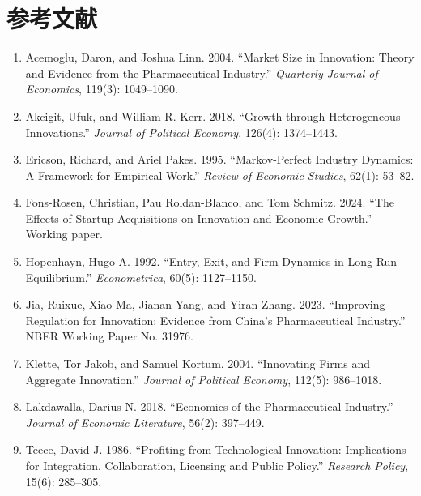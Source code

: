 \documentclass[12pt]{ctexart}
\begin{document}
\section*{参考文献}
\begin{enumerate}[leftmargin=2em]
    \item Acemoglu, Daron, and Joshua Linn. 2004. ``Market Size in Innovation: Theory and Evidence from the Pharmaceutical Industry.'' \textit{Quarterly Journal of Economics}, 119(3): 1049--1090.
    \item Akcigit, Ufuk, and William R. Kerr. 2018. ``Growth through Heterogeneous Innovations.'' \textit{Journal of Political Economy}, 126(4): 1374--1443.
    \item Ericson, Richard, and Ariel Pakes. 1995. ``Markov-Perfect Industry Dynamics: A Framework for Empirical Work.'' \textit{Review of Economic Studies}, 62(1): 53--82.
    \item Fons-Rosen, Christian, Pau Roldan-Blanco, and Tom Schmitz. 2024. ``The Effects of Startup Acquisitions on Innovation and Economic Growth.'' Working paper.
    \item Hopenhayn, Hugo A. 1992. ``Entry, Exit, and Firm Dynamics in Long Run Equilibrium.'' \textit{Econometrica}, 60(5): 1127--1150.
    \item Jia, Ruixue, Xiao Ma, Jianan Yang, and Yiran Zhang. 2023. ``Improving Regulation for Innovation: Evidence from China's Pharmaceutical Industry.'' NBER Working Paper No. 31976.
    \item Klette, Tor Jakob, and Samuel Kortum. 2004. ``Innovating Firms and Aggregate Innovation.'' \textit{Journal of Political Economy}, 112(5): 986--1018.
    \item Lakdawalla, Darius N. 2018. ``Economics of the Pharmaceutical Industry.'' \textit{Journal of Economic Literature}, 56(2): 397--449.
    \item Teece, David J. 1986. ``Profiting from Technological Innovation: Implications for Integration, Collaboration, Licensing and Public Policy.'' \textit{Research Policy}, 15(6): 285--305.
\end{enumerate}
\end{document}
